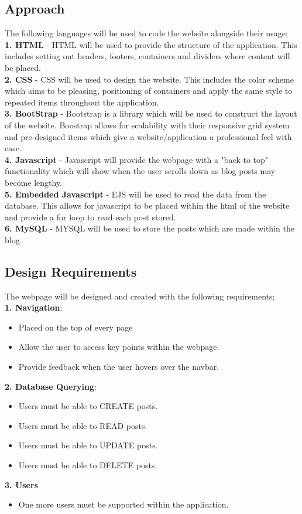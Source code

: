 \documentclass[10pt, a4paper]{article}
\begin{document}
	\subsection{Approach}
	The following languages will be used to code the website alongside their usage;\\
	\textbf{1. HTML} - HTML will be used to provide the structure of the application.  This includes setting out headers, footers, containers and dividers where content will be placed. \\
	\textbf{2. CSS} - CSS will be used to design the website.  This includes the color scheme which aims to be pleasing, positioning of containers and apply the same style to repeated items throughout the application. \\
	\textbf{3. BootStrap} - Bootstrap is a library which will be used to construct the layout of the website.  Boostrap allows for scalability with their responsive grid system and pre-designed items which give a website/application a professional feel with ease. \\
	\textbf{4. Javascript} - Javascript will provide the webpage with a "back to top" functionality which will show when the user scrolls down as blog posts may become lengthy. \\
	\textbf{5. Embedded Javascript} - EJS will be used to read the data from the database.  This allows for javascript to be placed within the html of the website and provide a for loop to read each post stored. \\
	\textbf{6. MySQL} - MYSQL will be used to store the posts which are made within the blog.  


	\subsection{Design Requirements}
	The webpage will be designed and created with the following requirements; \\
	\textbf{1. Navigation}: 
	\begin{itemize}
	\item Placed on the top of every page
	\item Allow the user to access key points within the webpage.
	\item Provide feedback when the user hovers over the navbar.
	\end{itemize}
	\textbf{2. Database Querying}:
	\begin{itemize}
	\item Users must be able to CREATE posts.
	\item Users must be able to READ posts. 
 	\item Users must be able to UPDATE posts. 
	\item Users must be able to DELETE posts. 
\end{itemize}
	\textbf{3. Users}
	\begin{itemize}
	\item One more users must be supported within the application. 
	\end{itemize}
	
\end{document}
